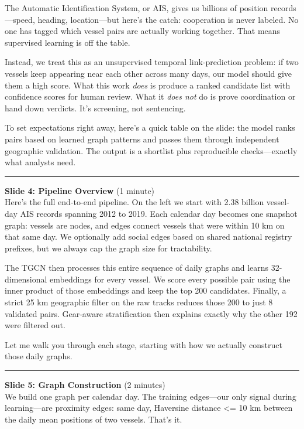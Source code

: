 \documentclass[
]{article}
\begin{document}
The Automatic Identification System, or AIS, gives us billions of
position records---speed, heading, location---but here's the catch:
cooperation is never labeled. No one has tagged which vessel pairs are
actually working together. That means supervised learning is off the
table.

Instead, we treat this as an unsupervised temporal link-prediction
problem: if two vessels keep appearing near each other across many days,
our model should give them a high score. What this work \emph{does} is
produce a ranked candidate list with confidence scores for human review.
What it \emph{does not} do is prove coordination or hand down verdicts.
It's screening, not sentencing.

To set expectations right away, here's a quick table on the slide: the
model ranks pairs based on learned graph patterns and passes them
through independent geographic validation. The output is a shortlist
plus reproducible checks---exactly what analysts need.

\begin{center}\rule{0.5\linewidth}{0.5pt}\end{center}

\textbf{Slide 4: Pipeline Overview} (1 minute)\\
Here's the full end-to-end pipeline. On the left we start with 2.38
billion vessel-day AIS records spanning 2012 to 2019. Each calendar day
becomes one snapshot graph: vessels are nodes, and edges connect vessels
that were within 10 km on that same day. We optionally add social edges
based on shared national registry prefixes, but we always cap the graph
size for tractability.

The TGCN then processes this entire sequence of daily graphs and learns
32-dimensional embeddings for every vessel. We score every possible pair
using the inner product of those embeddings and keep the top 200
candidates. Finally, a strict 25 km geographic filter on the raw tracks
reduces those 200 to just 8 validated pairs. Gear-aware stratification
then explains exactly why the other 192 were filtered out.

Let me walk you through each stage, starting with how we actually
construct those daily graphs.

\begin{center}\rule{0.5\linewidth}{0.5pt}\end{center}

\textbf{Slide 5: Graph Construction} (2 minutes)\\
We build one graph per calendar day. The training edges---our only
signal during learning---are proximity edges: same day, Haversine
distance \textless= 10 km between the daily mean positions of two
vessels. That's it.
\end{document}
